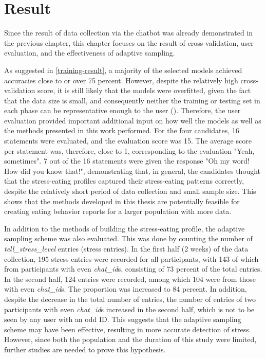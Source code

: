 
\chapter{Result}\label{chapter:result}
Since the result of data collection via the chatbot was already demonstrated in the previous chapter, this chapter focuses on the result of cross-validation, user evaluation, and the effectiveness of adaptive sampling.

As suggested in \autoref{training-result}, a majority of the selected models achieved accuracies close to or over 75 percent. However, despite the relatively high cross-validation score, it is still likely that the models were overfitted, given the fact that the data size is small, and consequently neither the training or testing set in each phase can be representative enough to the user (\cite{45_overfitting}). Therefore, the user evaluation provided important additional input on how well the models as well as the methods presented in this work performed. For the four candidates, 16 statements were evaluated, and the evaluation score was 15. The average score per statement was, therefore, close to 1, corresponding to the evaluation "Yeah, sometimes". 7 out of the 16 statements were given the response "Oh my word! How did you know that!", demonstrating that, in general, the candidates thought that the stress-eating profiles captured their stress-eating patterns correctly, despite the relatively short period of data collection and small sample size. This shows that the methods developed in this thesis are potentially feasible for creating eating behavior reports for a larger population with more data.

In addition to the methods of building the stress-eating profile, the adaptive sampling scheme was also evaluated. This was done by counting the number of \emph{tell\_stress\_level} entries (stress entries). In the first half (2 weeks) of the data collection, 195 stress entries were recorded for all participants, with 143 of which from participants with even \emph{chat\_id}s, consisting of 73 percent of the total entries. In the second half, 124 entries were recorded, among which 104 were from those with even \emph{chat\_id}s. The proportion was increased to 84 percent. In addition, despite the decrease in the total number of entries, the number of entries of two participants with even \emph{chat\_id}s increased in the second half, which is not to be seen by any user with an odd ID. This suggests that the adaptive sampling scheme may have been effective, resulting in more accurate detection of stress. However, since both the population and the duration of this study were limited, further studies are needed to prove this hypothesis.

